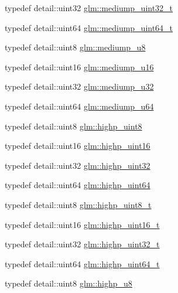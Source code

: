 \begin{DoxyCompactItemize}
\item 
typedef detail\+::uint32 \hyperlink{group__gtc__type__precision_gac7782c1e393f9ad47e41a177a685f287}{glm\+::mediump\+\_\+uint32\+\_\+t}
\item 
typedef detail\+::uint64 \hyperlink{group__gtc__type__precision_gaa97354d3120a6dc029a5e9563723de18}{glm\+::mediump\+\_\+uint64\+\_\+t}
\item 
typedef detail\+::uint8 \hyperlink{group__gtc__type__precision_gac04b372784392e82bd557f300c4de097}{glm\+::mediump\+\_\+u8}
\item 
typedef detail\+::uint16 \hyperlink{group__gtc__type__precision_ga6745262ef6a6fdb8637b2387ef924828}{glm\+::mediump\+\_\+u16}
\item 
typedef detail\+::uint32 \hyperlink{group__gtc__type__precision_gad0c27a525045c299a92306eb4cd7c13a}{glm\+::mediump\+\_\+u32}
\item 
typedef detail\+::uint64 \hyperlink{group__gtc__type__precision_ga00c51a16fa190b0a90205d50d6d8a44a}{glm\+::mediump\+\_\+u64}
\item 
typedef detail\+::uint8 \hyperlink{group__gtc__type__precision_ga2c27c6dd26e893786f04b10f99c1ee95}{glm\+::highp\+\_\+uint8}
\item 
typedef detail\+::uint16 \hyperlink{group__gtc__type__precision_ga4d32967d45ba8365e2a05eaaac85e978}{glm\+::highp\+\_\+uint16}
\item 
typedef detail\+::uint32 \hyperlink{group__gtc__type__precision_ga3145e44c73e2df7dfe4f3cb65974bf22}{glm\+::highp\+\_\+uint32}
\item 
typedef detail\+::uint64 \hyperlink{group__gtc__type__precision_ga8079c653e20cda03d34b99de629a7b09}{glm\+::highp\+\_\+uint64}
\item 
typedef detail\+::uint8 \hyperlink{group__gtc__type__precision_ga9ba529fcc75b82d23da979f0ce6e4518}{glm\+::highp\+\_\+uint8\+\_\+t}
\item 
typedef detail\+::uint16 \hyperlink{group__gtc__type__precision_ga3145bc0ee80432c165e985a188a722b3}{glm\+::highp\+\_\+uint16\+\_\+t}
\item 
typedef detail\+::uint32 \hyperlink{group__gtc__type__precision_ga8eb85ad460079c63b68866ae34637bda}{glm\+::highp\+\_\+uint32\+\_\+t}
\item 
typedef detail\+::uint64 \hyperlink{group__gtc__type__precision_ga6e66f40c5909bfc872b068187fa6029e}{glm\+::highp\+\_\+uint64\+\_\+t}
\item 
typedef detail\+::uint8 \hyperlink{group__gtc__type__precision_ga8a60abe782749c504fb5ae51eb8b49cc}{glm\+::highp\+\_\+u8}

\end{DoxyCompactItemize}
